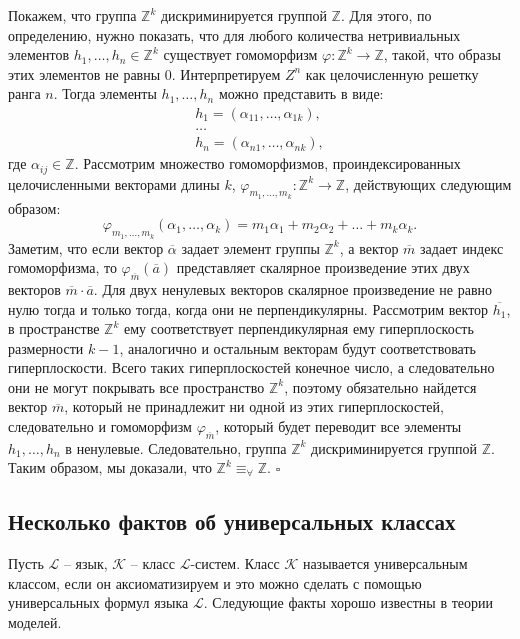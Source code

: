 \documentclass[a4paper,11pt,twoside]{article}
\def\K{{\mathcal{K}}}
\def\L{{\mathcal{L}}}
\def\Z{{\mathbb{Z}}}
\begin{document}
Покажем, что группа $\Z^k$ дискриминируется группой $\Z$. Для этого, по определению, нужно показать, что для любого количества нетривиальных элементов $h_1, \ldots, h_n \in \Z^k$ существует гомоморфизм $\varphi : \Z^k \rightarrow \Z$, такой, что образы этих элементов не равны 0. Интерпретируем $Z^n$ как целочисленную решетку ранга $n$. Тогда элементы $h_1, \ldots, h_n$ можно представить в виде:
$$\begin{array}{c}
 h_1 = (\alpha_{11}, \ldots, \alpha_{1k}), \\
 \ldots \\
 h_n = (\alpha_{n1}, \ldots, \alpha_{nk}),
 \end{array} $$
где $\alpha_{ij} \in \Z$. Рассмотрим множество гомоморфизмов, проиндексированных целочисленными векторами длины $k$, $\varphi_{m_1,\ldots,m_k} : \Z^k \rightarrow \Z$, действующих следующим образом:
$$\varphi_{m_1,\ldots,m_k} (\alpha_1, \ldots, \alpha_k) = m_1 \alpha_1 + m_2 \alpha_2 + \ldots + m_k \alpha_k.$$
Заметим, что если вектор $\overline{\alpha}$ задает элемент группы $\Z^k$, а вектор $\overline{m}$ задает индекс гомоморфизма, то $\varphi_{\overline{m}}(\overline{a})$ представляет скалярное произведение этих двух векторов $\overline{m} \cdot \overline{a}$. Для двух ненулевых векторов скалярное произведение не равно нулю тогда и только тогда, когда они не перпендикулярны. Рассмотрим вектор $\overline{h_1}$, в пространстве $\Z^k$ ему соответствует перпендикулярная ему гиперплоскость размерности $k-1$, аналогично и остальным векторам будут соответствовать гиперплоскости. Всего таких гиперплоскостей конечное число, а следовательно они не могут покрывать все пространство $\Z^k$, поэтому обязательно найдется вектор $\overline{m}$, который не принадлежит ни одной из этих гиперплоскостей, следовательно и гомоморфизм $\varphi_{\overline{m}}$, который будет переводит все элементы $h_1,\ldots, h_n$ в ненулевые. Следовательно, группа $\Z^k$ дискриминируется группой $\Z$. Таким образом, мы доказали, что $\Z^k \equiv_{\forall} \Z$. $\square$



\subsection{Несколько фактов об универсальных классах}

Пусть $\L$ -- язык, $\K$ -- класс $\L$-систем. Класс $\K$ называется универсальным классом, если он аксиоматизируем и это можно сделать с помощью универсальных формул языка $\L$. Следующие факты хорошо известны в теории моделей.
\end{document}
